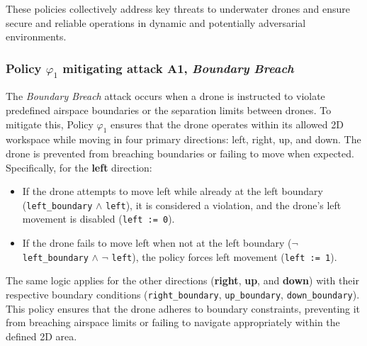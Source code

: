 These policies collectively address key threats to underwater drones and ensure secure and reliable operations in dynamic and potentially adversarial environments.

\subsubsection{Policy $\varphi_{1}$ mitigating attack A1, \emph{Boundary Breach}}

The \emph{Boundary Breach} attack occurs when a drone is instructed to violate predefined airspace boundaries or the separation limits between drones. To mitigate this, Policy $\varphi_1$ ensures that the drone operates within its allowed 2D workspace while moving in four primary directions: left, right, up, and down. The drone is prevented from breaching boundaries or failing to move when expected. Specifically, for the \textbf{left} direction:

\begin{itemize}
	\item If the drone attempts to move left while already at the left boundary (\texttt{left\_boundary} $\land$ \texttt{left}), it is considered a violation, and the drone's left movement is disabled (\texttt{left := 0}).
	\item If the drone fails to move left when not at the left boundary ($\neg$ \texttt{left\_boundary} $\land$ $\neg$ \texttt{left}), the policy forces left movement (\texttt{left := 1}).
\end{itemize}

The same logic applies for the other directions (\textbf{right}, \textbf{up}, and \textbf{down}) with their respective boundary conditions (\texttt{right\_boundary}, \texttt{up\_boundary}, \texttt{down\_boundary}). This policy ensures that the drone adheres to boundary constraints, preventing it from breaching airspace limits or failing to navigate appropriately within the defined 2D area.



